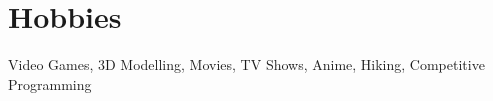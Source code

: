 \documentclass[letterpaper,12pt]{article}
\newcommand{\resumeSubHeadingListStart}{\begin{itemize}[leftmargin=0.15in, label={}]}
\newcommand{\resumeSubHeadingListEnd}{\end{itemize}}
\begin{document}

\section{Hobbies}
\resumeSubHeadingListStart
\small{\item{Video Games, 3D Modelling, Movies, TV Shows, Anime, Hiking, Competitive Programming }}
\resumeSubHeadingListEnd

\end{document}

